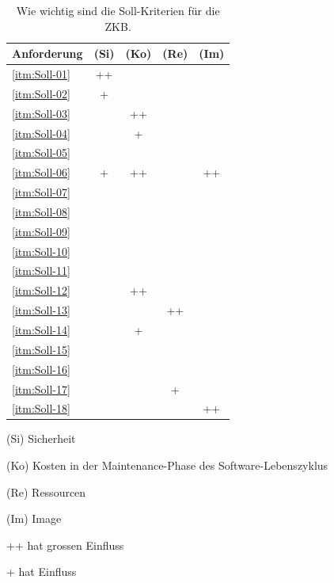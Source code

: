   \begin{table}[htb]
    \sffamily 
    \begin{center}
      \begin{threeparttable}
        \begin{tabular}{p{9cm}cccc}
          \toprule
          \textbf{Anforderung} & \textbf{(Si)} & \textbf{(Ko)} & \textbf{(Re)} &
          \textbf{(Im)}\\
          \midrule
          \ref{itm:Soll-01} & ++ &    &    &    \\
          \ref{itm:Soll-02} & +  &    &    &    \\
          \ref{itm:Soll-03} &    & ++ &    &    \\
          \ref{itm:Soll-04} &    & +  &    &    \\
          \ref{itm:Soll-05} &    &    &    &    \\
          \ref{itm:Soll-06} & +  & ++ &    & ++ \\
          \ref{itm:Soll-07} &    &    &    &    \\
          \ref{itm:Soll-08} &    &    &    &    \\
          \ref{itm:Soll-09} &    &    &    &    \\
          \ref{itm:Soll-10} &    &    &    &    \\
          \ref{itm:Soll-11} &    &    &    &    \\
          \ref{itm:Soll-12} &    & ++ &    &    \\
          \ref{itm:Soll-13} &    &    & ++ &    \\
          \ref{itm:Soll-14} &    & +  &    &    \\
          \ref{itm:Soll-15} &    &    &    &    \\
          \ref{itm:Soll-16} &    &    &    &    \\
          \ref{itm:Soll-17} &    &    & +  &    \\
          \ref{itm:Soll-18} &    &    &    & ++ \\
          \bottomrule
        \end{tabular}
        \caption{Wie wichtig sind die Soll-Kriterien für die ZKB.}
        \label{tab:kosolidierungDerSollKriterien}
        \medskip 
        \begin{tablenotes}[++]\footnotesize 
          \item[(Si)] Sicherheit 
          \item[(Ko)] Kosten in der Maintenance-Phase des Software-Lebenszyklus
          \item[(Re)] Ressourcen 
          \item[(Im)] Image
          \item[++] hat grossen Einfluss
          \item[+] hat Einfluss
        \end{tablenotes}
      \end{threeparttable}
    \end{center}
  \end{table}
  

